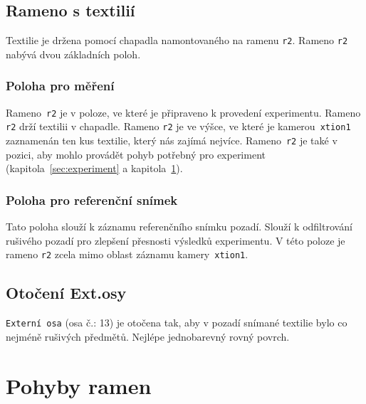\documentclass[10pt,a4paper,titlepage,oneside]{report}
\begin{document}
\subsection{Rameno s textilií}
Textilie je držena pomocí chapadla namontovaného na ramenu \verb|r2|. Rameno \verb|r2| nabývá dvou základních poloh. 
\subsubsection{Poloha pro měření}
Rameno~\verb|r2| je v poloze, ve které je připraveno k provedení experimentu. Rameno \verb|r2| drží textilii v chapadle. Rameno \verb|r2| je ve výšce, ve které je kamerou~\verb|xtion1| zaznamenán ten kus textilie, který nás zajímá nejvíce. Rameno~\verb|r2| je také v pozici, aby mohlo provádět pohyb potřebný pro experiment (kapitola~\ref{sec:experiment} a kapitola~\ref{sec:moveArm}).
\subsubsection{Poloha pro referenční snímek}
Tato poloha slouží k záznamu referenčního snímku pozadí. Slouží k odfiltrování rušivého pozadí pro zlepšení přesnosti výsledků experimentu. V této poloze je rameno \verb|r2| zcela mimo oblast záznamu kamery~\verb|xtion1|.

\subsection{Otočení Ext.osy}
\verb|Externí osa| (osa č.: 13) je otočena tak, aby v pozadí snímané textilie bylo co nejméně rušivých předmětů. Nejlépe jednobarevný rovný povrch.

\section{Pohyby ramen}
\label{sec:moveArm}
\end{document}
